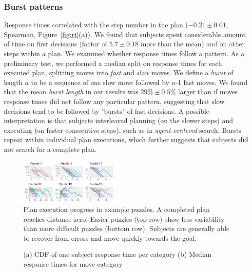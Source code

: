 \documentclass[10pt,letterpaper]{article}
\begin{document}
\subsubsection{Burst patterns}

Response times correlated with the step number in the plan ($-0.21\pm0.01$, Spearman, Figure~\ref{fig:rt}(a)). We found that subjects spent considerable amount of time on first decisions (factor of $5.7\pm0.18$ more than the mean) and on other steps within a plan. We examined whether response times follow a pattern. As a preliminary test, we performed a median split on response times for each executed plan, splitting moves into \emph{fast} and \emph{slow} moves. We define a \emph{burst} of length $n$ to be a sequence of one slow move followed by $n$-1 fast moves. We found that the mean \emph{burst length} in our results was $29\%\pm0.5\%$ larger than if moves response times did not follow any particular pattern, suggesting that slow decisions tend to be followed by "bursts" of fast decisions. A possible interpretation is that subjects interleaved planning (on the slower steps) and executing (on faster consecutive steps), such as in \emph{agent-centered} search. Bursts repeat within individual plan executions, which further suggests that subjects did not search for a complete plan.

\begin{figure}[t!]
\begin{center}
\includegraphics[width=0.44\textwidth]{p6_1}
\end{center}
\caption{Plan execution progress in example puzzles. A completed plan reaches distance zero. Easier puzzles (top row) show less variability than more difficult puzzles (bottom row). Subjects are generally able to recover from errors and move quickly towards the goal.} 
\label{fig:progress}
\vspace{-0.35cm}
\end{figure}


\begin{figure}[t!]
	\centering
	\caption{(a) CDF of one subject response time per category (b) Median response times for move category} 
	\label{fig:rt_cat}
	\vspace{-0.35cm}
\end{figure}
\end{document}

